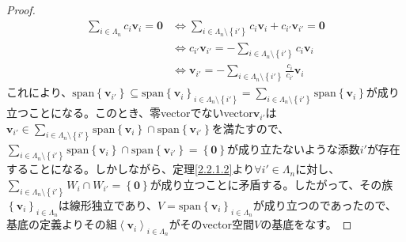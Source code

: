 \documentclass[dvipdfmx]{jsarticle}
\begin{document}
\begin{proof}
\begin{align*}
\sum_{i \in \varLambda_{n}} {c_{i}\mathbf{v}_{i}} = \mathbf{0} &\Leftrightarrow \sum_{i \in \varLambda_{n} \setminus \left\{ i' \right\}} {c_{i}\mathbf{v}_{i}} + c_{i'}\mathbf{v}_{i'} = \mathbf{0}\\
&\Leftrightarrow c_{i'}\mathbf{v}_{i'} = - \sum_{i \in \varLambda_{n} \setminus \left\{ i' \right\}} {c_{i}\mathbf{v}_{i}}\\
&\Leftrightarrow \mathbf{v}_{i'} = - \sum_{i \in \varLambda_{n} \setminus \left\{ i' \right\}} {\frac{c_{i}}{c_{i'}}\mathbf{v}_{i}}
\end{align*}
これにより、${\mathrm{span} }\left\{ \mathbf{v}_{i'} \right\} \subseteq {\mathrm{span} }\left\{ \mathbf{v}_{i} \right\}_{i \in \varLambda_{n} \setminus \left\{ i' \right\}} = \sum_{i \in \varLambda_{n} \setminus \left\{ i' \right\}} {{\mathrm{span} }\left\{ \mathbf{v}_{i} \right\}}$が成り立つことになる。このとき、零vectorでないvector$\mathbf{v}_{i'}$は$\mathbf{v}_{i'} \in \sum_{i \in \varLambda_{n} \setminus \left\{ i' \right\}} {{\mathrm{span} }\left\{ \mathbf{v}_{i} \right\}} \cap {\mathrm{span} }\left\{ \mathbf{v}_{i'} \right\}$を満たすので、$\sum_{i \in \varLambda_{n} \setminus \left\{ i' \right\}} {{\mathrm{span} }\left\{ \mathbf{v}_{i} \right\}} \cap {\mathrm{span} }\left\{ \mathbf{v}_{i'} \right\} = \left\{ \mathbf{0} \right\}$が成り立たないような添数$i'$が存在することになる。しかしながら、定理\ref{2.2.1.2}より$\forall i' \in \varLambda_{n}$に対し、$\sum_{i \in \varLambda_{n} \setminus \left\{ i' \right\}} W_{i} \cap W_{i'} = \left\{ \mathbf{0} \right\}$が成り立つことに矛盾する。したがって、その族$\left\{ \mathbf{v}_i \right\}_{i \in \varLambda_{n} } $は線形独立であり、$V = {\mathrm{span} }\left\{ \mathbf{v}_{i} \right\}_{i \in \varLambda_{n}}$が成り立つのであったので、基底の定義よりその組$\left\langle \mathbf{v}_{i} \right\rangle_{i \in \varLambda_{n}}$がそのvector空間$V$の基底をなす。
\end{proof}
\end{document}
